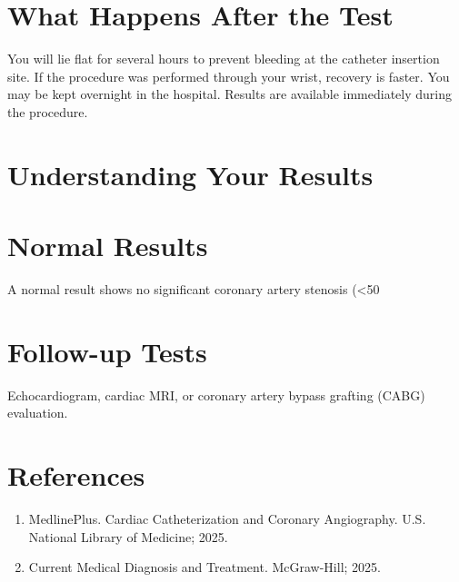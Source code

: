 \section*{What Happens After the Test}
You will lie flat for several hours to prevent bleeding at the catheter insertion site. If the procedure was performed through your wrist, recovery is faster. You may be kept overnight in the hospital. Results are available immediately during the procedure.

\section*{Understanding Your Results}

\section*{Normal Results}
A normal result shows no significant coronary artery stenosis (<50%

\section*{Follow-up Tests}
Echocardiogram, cardiac MRI, or coronary artery bypass grafting (CABG) evaluation.

\section*{References}
\begin{enumerate}
  \item MedlinePlus. Cardiac Catheterization and Coronary Angiography. U.S. National Library of Medicine; 2025.
  \item Current Medical Diagnosis and Treatment. McGraw-Hill; 2025.
\end{enumerate}

\clearpage
